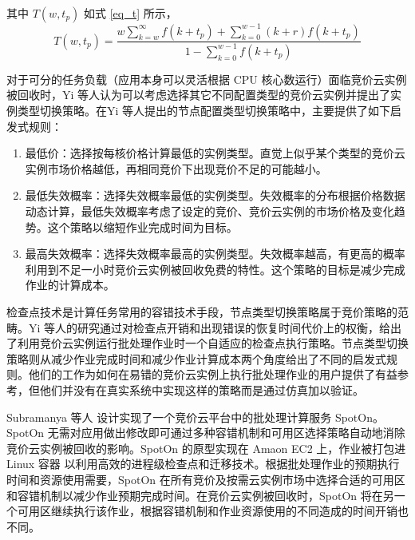 其中 $T(w, t_p)$ 如式 \eqref{eq_t} 所示，
\begin{equation}\label{eq_t} 
T(w,t_p) = \frac{w\sum_{k=w}^{\infty}f(k+t_p)+\sum_{k=0}^{w-1}(k+r)f(k+t_p)}{1-\sum_{k=0}^{w-1}f(k+t_p)}
\end{equation}

对于可分的任务负载（应用本身可以灵活根据 CPU 核心数运行）面临竞价云实例被回收时，Yi 等人认为可以考虑选择其它不同配置类型的竞价云实例并提出了实例类型切换策略。在Yi 等人提出的节点配置类型切换策略中，主要提供了如下启发式规则：
\begin{enumerate}
\item 最低价：选择按每核价格计算最低的实例类型。直觉上似乎某个类型的竞价云实例市场价格越低，再相同竞价下出现竞价不足的可能越小。
\item 最低失效概率：选择失效概率最低的实例类型。失效概率的分布根据价格数据动态计算，最低失效概率考虑了设定的竞价、竞价云实例的市场价格及变化趋势。这个策略以缩短作业完成时间为目标。
\item 最高失效概率：选择失效概率最高的实例类型。失效概率越高，有更高的概率利用到不足一小时竞价云实例被回收免费的特性。这个策略的目标是减少完成作业的计算成本。
\end{enumerate}

检查点技术是计算任务常用的容错技术手段，节点类型切换策略属于竞价策略的范畴。Yi 等人的研究通过对检查点开销和出现错误的恢复时间代价上的权衡，给出了利用竞价云实例运行批处理作业时一个自适应的检查点执行策略。节点类型切换策略则从减少作业完成时间和减少作业计算成本两个角度给出了不同的启发式规则。他们的工作为如何在易错的竞价云实例上执行批处理作业的用户提供了有益参考，但他们并没有在真实系统中实现这样的策略而是通过仿真加以验证。

Subramanya 等人 \cite{Subramanya:2015:SBC:2806777.2806851} 设计实现了一个竞价云平台中的批处理计算服务 SpotOn。SpotOn 无需对应用做出修改即可通过多种容错机制和可用区选择策略自动地消除竞价云实例被回收的影响。SpotOn 的原型实现在 Amaon EC2 上，作业被打包进 Linux 容器 \cite{LXC} 以利用高效的进程级检查点和迁移技术。根据批处理作业的预期执行时间和资源使用需要，SpotOn 在所有竞价及按需云实例市场中选择合适的可用区和容错机制以减少作业预期完成时间。在竞价云实例被回收时，SpotOn 将在另一个可用区继续执行该作业，根据容错机制和作业资源使用的不同造成的时间开销也不同。

